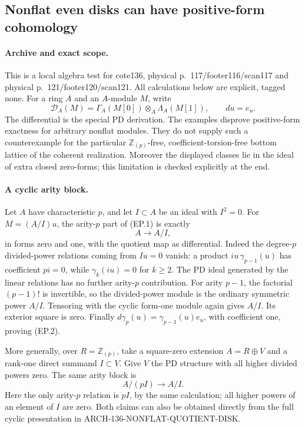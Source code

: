 \subsection{Nonflat even disks can have positive-form cohomology}
\label{arch136:even-disk-positive}

\paragraph{Archive and exact scope.}
This is a local algebra test for cote136, physical
p.~117/footer116/scan117 and physical p.~121/footer120/scan121.
All calculations below are explicit, tagged none. For a ring
\(A\) and an \(A\)-module \(M\), write
\[
 \mathscr D_A(M)=\Gamma_A(M[0])\otimes_A\Lambda_A(M[1]),
 \qquad du=e_u.                                         \tag{EP.1}
\]
The differential is the special PD derivation. The examples
disprove positive-form exactness for arbitrary nonflat modules.
They do not supply such a counterexample for the particular
\(\mathbb Z_{(p)}\)-free, coefficient-torsion-free bottom
lattice of the coherent realization. Moreover the displayed
classes lie in the ideal of extra closed zero-forms; this
limitation is checked explicitly at the end.

\paragraph{A cyclic arity block.}
Let \(A\) have characteristic \(p\), and let \(I\subset A\)
be an ideal with \(I^2=0\). For \(M=(A/I)u\), the
arity-\(p\) part of (EP.1) is exactly
\[
                         A\longrightarrow A/I,          \tag{EP.2}
\]
in forms zero and one, with the quotient map as differential.
Indeed the degree-\(p\) divided-power relations coming from
\(Iu=0\) vanish: a product \(iu\,\gamma_{p-1}(u)\)
has coefficient \(pi=0\), while \(\gamma_k(iu)=0\)
for \(k\geq2\). The PD ideal generated by the linear
relations has no further arity-\(p\) contribution. For
arity \(p-1\), the factorial \((p-1)!\) is invertible,
so the divided-power module is the ordinary symmetric power
\(A/I\). Tensoring with the cyclic form-one module again
gives \(A/I\). Its exterior square is zero. Finally
\(d\gamma_p(u)=\gamma_{p-1}(u)e_u\), with coefficient
one, proving (EP.2).

More generally, over \(R=\mathbb Z_{(p)}\), take a
square-zero extension \(A=R\oplus V\) and a rank-one
direct summand \(I\subset V\). Give \(V\) the PD
structure with all higher divided powers zero. The same
arity block is
\[
                         A/(pI)\longrightarrow A/I.     \tag{EP.3}
\]
Here the only arity-\(p\) relation is \(pI\), by the
same calculation; all higher powers of an element of \(I\)
are zero. Both claims can also be obtained directly from the
full cyclic presentation in ARCH-136-NONFLAT-QUOTIENT-DISK.

